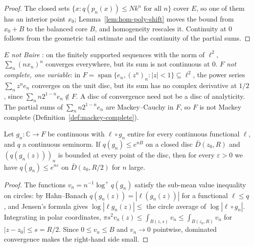\begin{proof}
  \leanok
  The closed sets $\{x : q(p_n(x)) \le N k^n \text{ for all } n\}$ cover $E$, so one of them has
  an interior point $x_0$; Lemma~\ref{lem:hom-poly-shift} moves the bound from $x_0 + B$ to
  the balanced core $B$, and homogeneity rescales it. Continuity at $0$ follows from the
  geometric tail estimate and the continuity of the partial sums.
\end{proof}

\begin{remark}[Counterexamples]
  \label{rem:bs-counterexamples}
  \leanok
  \emph{$E$ not Baire} \cite[Counterexample~5.1]{BS71b}: on the finitely supported sequences
  with the norm of $\ell^2$, $\sum_n (n x_n)^n$ converges everywhere, but its sum is not
  continuous at $0$. \emph{$F$ not complete, one variable}: in
  $F = \operatorname{span}\{e_n, (z^n)_n : |z| < 1\} \subseteq \ell^2$, the power series
  $\sum_n z^n e_n$ converges on the unit disc, but its sum has no complex derivative at $1/2$,
  since $\sum_n n 2^{1-n} e_n \notin F$. A disc of convergence need not be a disc of analyticity.
  The partial sums of $\sum_n n 2^{1-n} e_n$ are Mackey--Cauchy in $F$, so $F$ is not Mackey
  complete (Definition~\ref{def:mackey-complete}).
\end{remark}

\begin{lemma}
  \label{lem:hartogs}
  \leanok
  Let $g_n \colon \mathbb{C} \to F$ be continuous with $\ell \circ g_n$ entire for every
  continuous functional $\ell$, and $q$ a continuous seminorm. If $q(g_n) \le e^{nB}$ on a closed
  disc $\bar D(z_0, R)$ and $(q(g_n(z)))_n$ is bounded at every point of the disc, then for every
  $\varepsilon > 0$ we have $q(g_n) \le e^{n\varepsilon}$ on $\bar D(z_0, R/2)$ for $n$ large.
\end{lemma}

\begin{proof}
  \leanok
  The functions $v_n = n^{-1} \log^+ q(g_n)$ satisfy the sub-mean value inequality on circles:
  by Hahn--Banach $q(g_n(z)) = |\ell(g_n(z))|$ for a functional $\ell \le q$, and Jensen's formula
  gives $\log |\ell g_n(z)| \le$ the circle average of $\log |\ell \circ g_n|$. Integrating in
  polar coordinates, $\pi s^2 v_n(z) \le \int_{B(z,s)} v_n \le \int_{B(z_0,R)} v_n$ for
  $|z - z_0| \le s = R/2$. Since $0 \le v_n \le B$ and $v_n \to 0$ pointwise, dominated
  convergence makes the right-hand side small.
\end{proof}

